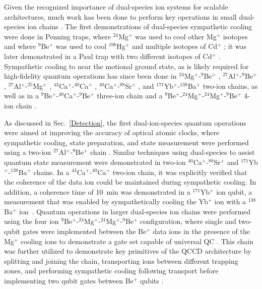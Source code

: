 \documentclass[%
12pt,
 amsmath,amssymb,
]{revtex4-2}
\begin{document}
Given the recognized importance of dual-species ion systems for scalable architectures, much work has been done to perform key operations in small dual-species ion chains \cite{HomeMixedSpecies2013}.  The first demonstrations of dual-species sympathetic cooling were done in Penning traps, where $^{24}$Mg$^+$ was used to cool other Mg$^+$ isotopes \cite{DrullingerSympCooling1980} and where $^9$Be$^+$ was used to cool $^{198}$Hg$^+$ \cite{LarsonSympCooling1986} and multiple isotopes of Cd$^+$ \cite{ImajoSympCooling1996}; it was later demonstrated in a Paul trap with two different isotopes of Cd$^+$ \cite{BlinovSympCooling2002}.  Sympathetic cooling to near the motional ground state, as is likely required for high-fidelity quantum operations has since been done in $^{24}$Mg$^+$-$^9$Be$^+$ \cite{BarrettSympCooling2003}, $^{27}$Al$^+$-$^9$Be$^+$ \cite{SchmidtQuantumLogicSpectroscopy}, $^{27}$Al$^+$-$^{25}$Mg$^+$ \cite{ChouAlClockcomp2010},  $^{43}$Ca$^+$-$^{40}$Ca$^+$ \cite{HomeCompleteMethods2009}, $^{40}$Ca$^+$-$^{88}$Sr$^+$ \cite{BruzewiczQLAR2017}, and $^{171}$Yb$^+$-$^{138}$Ba$^+$ \cite{InlekMultiNode2017} two-ion chains, as well as in a $^{9}$Be$^+$-$^{40}$Ca$^+$-$^{9}$Be$^+$ three-ion chain \cite{NegnevitskyMultiReadout2018} and a $^{9}$Be$^+$-$^{24}$Mg$^+$-$^{24}$Mg$^+$-$^{9}$Be$^+$ 4-ion chain \cite{JostEntangledOsc2009}.

As discussed in Sec.~\ref{Detection}, the first dual-ion-species quantum operations were aimed at improving the accuracy of optical atomic clocks, where sympathetic cooling, state preparation, and state measurement were performed using a two-ion $^{27}$Al$^+$-$^9$Be$^+$ chain \cite{SchmidtQuantumLogicSpectroscopy}.  Similar techniques using dual-species to assist quantum state measurement were demonstrated in two-ion $^{40}$Ca$^+$-$^{88}$Sr$^+$ \cite{BruzewiczQLAR2017} and $^{171}$Yb$^+$-$^{138}$Ba$^+$ \cite{InlekMultiNode2017} chains.  In a $^{43}$Ca$^+$-$^{40}$Ca$^+$ \cite{HomeSympCoolMem2009} two-ion chain, it was explicitly verified that the coherence of the data ion could be maintained during sympathetic cooling.  In addition, a coherence time of 10~min was demonstrated in a $^{171}$Yb$^+$ ion qubit, a measurement that was enabled by sympathetically cooling the Yb$^+$ ion with a $^{138}$Ba$^+$ ion~\cite{wang2017single}. Quantum operations in larger dual-species ion chains were performed using the four ion $^{9}$Be$^+$-$^{24}$Mg$^+$-$^{24}$Mg$^+$-$^{9}$Be$^+$ configuration, where single and two-qubit gates were implemented between the Be$^+$ data ions in the presence of the Mg$^+$ cooling ions to demonstrate a gate set capable of universal QC \cite{HannekeProgrammable2009}.  This chain was further utilized to demonstrate key primitives of the QCCD architecture by splitting and joining the chain, transporting ions between different trapping zones, and performing sympathetic cooling following transport before implementing two qubit gates between Be$^+$ qubits \cite{HomeCompleteMethods2009}.
\end{document}
